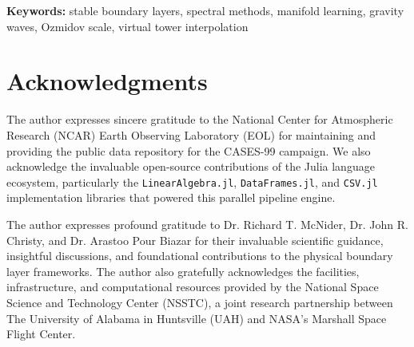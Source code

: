 \documentclass[11pt,a4paper]{article}
\begin{document}
\begin{abstract}
We extend the theoretical framework by establishing an explicit physical link to the Ozmidov buoyancy scale $L_O$, resolving the grid-topology mismatch via a generalized metric-consistent Virtual Tower interpolation operator ($\mathcal{P}_{\mathrm{VT}}$) for direct NWP model validation, and formulating a $2/3$-rule spectral anti-aliasing filter for forward-predictive implementations. A synthetic gravity-wave reflection test confirms that the spectral partition functions suppress upper-boundary reflection by approximately $3.3\times 10^4$, validating the sponge-layer boundary conditions.
\end{abstract}

\noindent \textbf{Keywords:} stable boundary layers, spectral methods, manifold learning, gravity waves, Ozmidov scale, virtual tower interpolation









\newpage
\section*{Acknowledgments}
The author expresses sincere gratitude to the National Center for Atmospheric Research (NCAR) Earth Observing Laboratory (EOL) for maintaining and providing the public data repository for the CASES-99 campaign. We also acknowledge the invaluable open-source contributions of the Julia language ecosystem, particularly the \texttt{LinearAlgebra.jl}, \texttt{DataFrames.jl}, and \texttt{CSV.jl} implementation libraries that powered this parallel pipeline engine.

The author expresses profound gratitude to Dr. Richard T. McNider, Dr. John R. Christy, and Dr. Arastoo Pour Biazar for their invaluable scientific guidance, insightful discussions, and foundational contributions to the physical boundary layer frameworks. The author also gratefully acknowledges the facilities, infrastructure, and computational resources provided by the National Space Science and Technology Center (NSSTC), a joint research partnership between The University of Alabama in Huntsville (UAH) and NASA's Marshall Space Flight Center.



\end{document}
